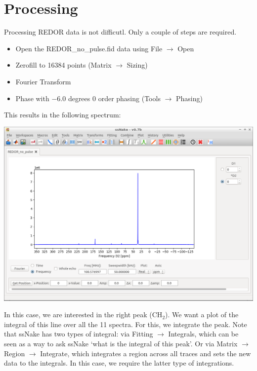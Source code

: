 \documentclass[11pt,a4paper]{article}
\begin{document}
\section{Processing}
Processing REDOR data is not difficutl.
Only a couple of steps are required.

\begin{itemize}
\item Open the REDOR\_no\_pulse.fid data using File $\longrightarrow$ Open
\item Zerofill to 16384 points (Matrix  $\longrightarrow$ Sizing)
\item Fourier Transform
\item Phase with $-6.0$ degrees 0 order phasing (Tools $\longrightarrow$ Phasing)
\end{itemize}
This results in the following spectrum:
\begin{center}
\includegraphics[width=0.8\linewidth]{Figs/Fig1.png}
\end{center}
In this case, we are interested in the right peak (CH$_2$).
We want a plot of the integral of this line over all the 11 spectra.
For this, we integrate the peak.
Note that ssNake has two types of integral: via Fitting  $\longrightarrow$ Integrals, which can be seen as a way to ask ssNake `what is the integral of this peak'.
Or via Matrix $\longrightarrow$ Region $\longrightarrow$
Integrate, which integrates a region across all traces and sets the new data to the integrals.
In this case, we require the latter type of integrations.
\end{document}
